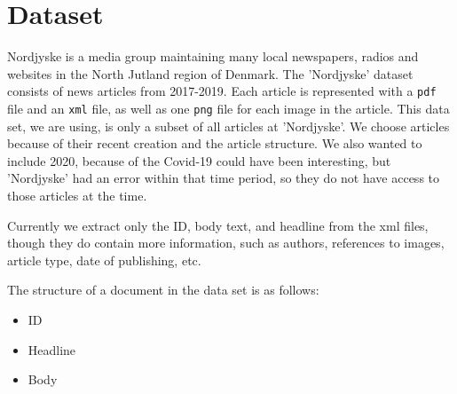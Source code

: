 \section{Dataset}
Nordjyske is a media group maintaining many local newspapers, radios and websites in the North Jutland region of Denmark.
The 'Nordjyske' dataset consists of news articles from 2017-2019. 
Each article is represented with a \texttt{pdf} file and an \texttt{xml} file, as well as one \texttt{png} file for each image in the article.
This data set, we are using, is only a subset of all articles at 'Nordjyske'.
We choose articles because of their recent creation and the article structure.
We also wanted to include 2020, because of the Covid-19 could have been interesting, but 'Nordjyske' had an error within that time period, so they do not have access to those articles at the time.

Currently we extract only the ID, body text, and headline from the xml files, though they do contain more information, such as authors, references to images, article type, date of publishing, etc.

The structure of a document in the data set is as follows:
\begin{itemize}
	\item ID
	\item Headline
	\item Body
\end{itemize}
